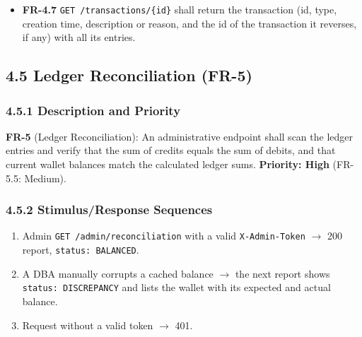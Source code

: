 \documentclass[11pt,a4paper]{article}
\providecommand{\tightlist}{\setlength{\itemsep}{2pt}\setlength{\parskip}{0pt}}
\begin{document}
\begin{itemize}
  with database access alone cannot rebuild the chain, and FR-5.5 detects any entry changed,
  inserted or deleted out of band. The one exception is deleting a wallet's newest entries, which
  would need a copy of the chain head outside the database (out of scope for 1.0). The service
  shall refuse to start if the key is unset or empty, or if it differs from the key the ledger was
  created with (checked against a stored HMAC of a fixed string; key rotation is out of scope for
  1.0). A wallet's chain grows only under the wallet locks FR-3.3 already takes, so FR-3.5 still
  holds. The chain format (each chain's starting value, the exact fields, their byte encoding and
  the fixed string for the key check) is to be recorded in ADR-0008 and shall not change once
  entries exist.
\item
  \textbf{FR-4.7} \texttt{GET\ /\allowbreak{}transactions/\allowbreak{}\{id\}} shall return the transaction (id, type, creation time,
  description or reason, and the id of the transaction it reverses, if any) with all its entries.
\end{itemize}

\subsection{4.5 Ledger Reconciliation (FR-5)}\label{ledger-reconciliation-fr-5}

\subsubsection{4.5.1 Description and Priority}\label{description-and-priority-4}

\textbf{FR-5} (Ledger Reconciliation): An administrative endpoint shall scan the ledger entries and
verify that the sum of credits equals the sum of debits, and that current wallet balances match
the calculated ledger sums. \textbf{Priority: High} (FR-5.5: Medium).

\subsubsection{4.5.2 Stimulus/Response Sequences}\label{stimulusresponse-sequences-4}

\begin{enumerate}
\def\labelenumi{\arabic{enumi}.}
\tightlist
\item
  Admin \texttt{GET\ /\allowbreak{}admin/\allowbreak{}reconciliation} with a valid \texttt{X-Admin-Token} \ensuremath{\rightarrow} 200 report, \texttt{status:\ BALANCED}.
\item
  A DBA manually corrupts a cached balance \ensuremath{\rightarrow} the next report shows \texttt{status:\ DISCREPANCY} and lists
  the wallet with its expected and actual balance.
\item
  Request without a valid token \ensuremath{\rightarrow} 401.
\end{enumerate}
\end{document}
